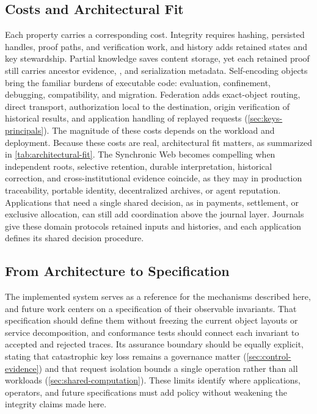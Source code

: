 \subsection{Costs and Architectural Fit}

Each property carries a corresponding cost. Integrity requires hashing, persisted handles, proof paths, and verification work, and history adds retained states and key stewardship. Partial knowledge saves content storage, yet each retained proof still carries ancestor evidence, , and serialization metadata. Self-encoding objects bring the familiar burdens of executable code: evaluation, confinement, debugging, compatibility, and migration. Federation adds exact-object routing, direct transport, authorization local to the destination, origin verification of historical results, and application handling of replayed requests (\cref{sec:keys-principals}). The magnitude of these costs depends on the workload and deployment. Because these costs are real, architectural fit matters, as summarized in \cref{tab:architectural-fit}. The Synchronic Web becomes compelling when independent roots, selective retention, durable interpretation, historical correction, and cross-institutional evidence coincide, as they may in production traceability, portable identity, decentralized archives, or agent reputation. Applications that need a single shared decision, as in payments, settlement, or exclusive allocation, can still add coordination above the journal layer. Journals give these domain protocols retained inputs and histories, and each application defines its shared decision procedure.

\begin{table}[htbp]
  \centering
  \small
  
  \caption{Architectural Fit}
  \label{tab:architectural-fit}
\end{table}

\subsection{From Architecture to Specification}

The implemented system serves as a reference for the mechanisms described here, and future work centers on a specification of their observable invariants. That specification should define them without freezing the current object layouts or service decomposition, and conformance tests should connect each invariant to accepted and rejected traces. Its assurance boundary should be equally explicit, stating that catastrophic key loss remains a governance matter (\cref{sec:control-evidence}) and that request isolation bounds a single operation rather than all workloads (\cref{sec:shared-computation}). These limits identify where applications, operators, and future specifications must add policy without weakening the integrity claims made here.

